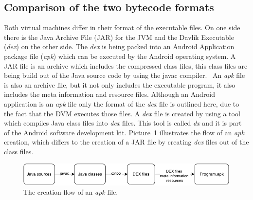 \subsection{Comparison of the two bytecode formats}
\label{sec:comparison-of-the-two-bytecode-formats}
Both virtual machines differ in their format of the executable files.
On one side there is the Java Archive File (JAR) for the JVM and the Davlik Executable (\textit{dex}) on the other side.
The \textit{dex} is being packed into an Android Application package file (\textit{apk}) which can be executed by the Android operating system.
A JAR file is an archive which includes the compressed class files, this class files are being build out of the Java source code by using the javac compiler.~\cite{pugh1999compressing} 
An \textit{apk} file is also an archive file, but it not only includes the executable program, it also includes the meta information and resource files.
Although an Android application is an \textit{apk} file only the format of the \textit{dex} file is outlined here, due to the fact that the DVM executes those files.
A \textit{dex} file is created by using a tool which compiles Java class files into \textit{dex} files.
This tool is called \textit{dx} and it is part of the Android software development kit.
Picture~\ref{fig:create-apk} illustrates the flow of an \textit{apk} creation, which differs to the creation of a JAR file by creating \textit{dex} files out of the class files.\\
\begin{figure}[h]
\begin{center}
\includegraphics[scale=0.55]{images/create-apk.png} 
\caption{The creation flow of an \textit{apk} file.}
\label{fig:create-apk}
\end{center}
\end{figure}

